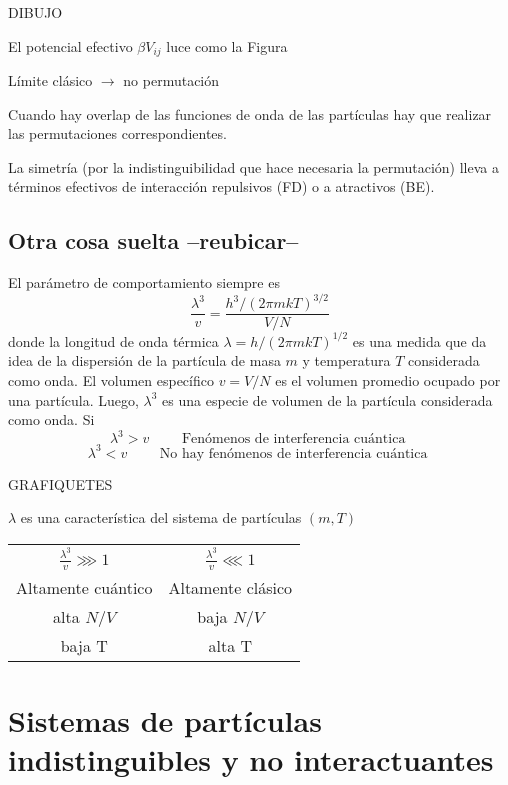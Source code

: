 \documentclass[10pt,oneside]{CBFT_book}
\begin{document}
DIBUJO 

El potencial efectivo $\beta V_{ij}$ luce como la Figura


Límite clásico $\to$ no permutación 

Cuando hay overlap de las funciones de onda de las partículas hay que realizar las permutaciones correspondientes.

La simetría (por la indistinguibilidad que hace necesaria la permutación) lleva a términos efectivos de interacción 
repulsivos (FD) o a atractivos (BE).

\subsection{Otra cosa suelta --reubicar--}

El parámetro de comportamiento siempre es
\[
	\frac{\lambda^3}{v} = \frac{h^3/(2\pi m kT)^{3/2}}{V/N}
\]
donde la longitud de onda térmica $\lambda = h/(2\pi m kT)^{1/2}$ es una medida que da idea de la dispersión de la 
partícula de masa $m$ y temperatura $T$ considerada como onda. El volumen específico $v=V/N$ es el volumen promedio 
ocupado por una partícula. Luego, $\lambda^3$ es una especie de volumen de la partícula considerada como onda.
Si 
\[
	\lambda^3 > v \qquad \text{ Fenómenos de interferencia cuántica }
\]
\[
	\lambda^3 < v \qquad \text{ No hay fenómenos de interferencia cuántica }
\]

GRAFIQUETES

$\lambda$ es una característica del sistema de partículas $(m,T)$
\begin{center}
\begin{tabular}{c c}
$\displaystyle \frac{\lambda^3}{v} \ggg 1 $ & $\displaystyle \frac{\lambda^3}{v} \lll 1 $ \\
Altamente cuántico &  Altamente clásico\\
alta $N/V$ & baja $N/V$\\
baja T & alta T
\end{tabular}
\end{center}



\section{Sistemas de partículas indistinguibles y no interactuantes}
\end{document}
